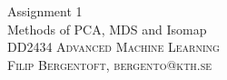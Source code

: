 \documentclass[11pt,oneside,a4paper]{article}
\date{}
\theoremstyle{definition}
\theoremstyle{remark}
\begin{document}
\renewcommand{\bibname}{References}
\hypersetup{citecolor=black}
\begin{titlepage}\centering
\vspace*{\fill}
\Huge Assignment 1\\
\vspace*{10mm}
\large Methods of PCA, MDS and Isomap \\
\vspace*{\fill}
\large \textsc{DD2434 Advanced Machine Learning} \\
\textsc{Filip Bergentoft, bergento@kth.se} \\
\end{titlepage}

\newpage


\end{document}
